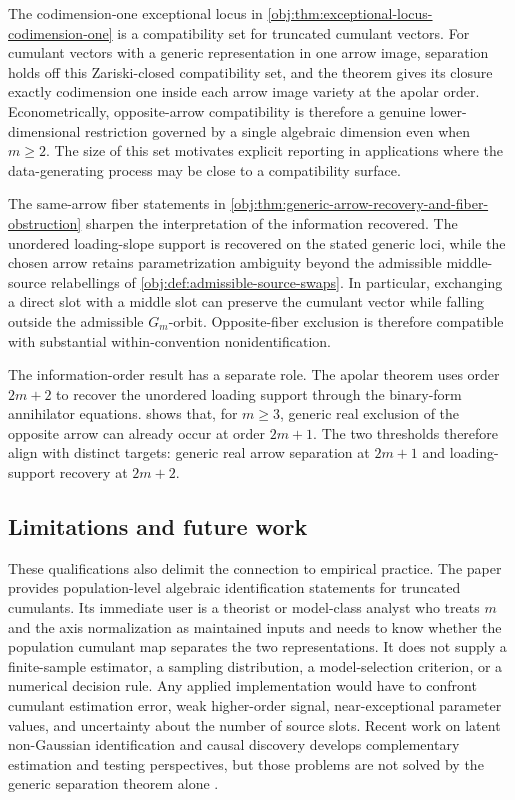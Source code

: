 \documentclass[11pt]{article}
\begin{document}
The codimension-one exceptional locus in \cref{obj:thm:exceptional-locus-codimension-one} is a compatibility set for truncated cumulant vectors. For cumulant vectors with a generic representation in one arrow image, separation holds off this Zariski-closed compatibility set, and the theorem gives its closure exactly codimension one inside each arrow image variety at the apolar order. Econometrically, opposite-arrow compatibility is therefore a genuine lower-dimensional restriction governed by a single algebraic dimension even when \(m\ge2\). The size of this set motivates explicit reporting in applications where the data-generating process may be close to a compatibility surface.

The same-arrow fiber statements in \cref{obj:thm:generic-arrow-recovery-and-fiber-obstruction} sharpen the interpretation of the information recovered. The unordered loading-slope support is recovered on the stated generic loci, while the chosen arrow retains parametrization ambiguity beyond the admissible middle-source relabellings of \cref{obj:def:admissible-source-swaps}. In particular, exchanging a direct slot with a middle slot can preserve the cumulant vector while falling outside the admissible \(G_m\)-orbit. Opposite-fiber exclusion is therefore compatible with substantial within-convention nonidentification.

The information-order result has a separate role. The apolar theorem uses order \(2m+2\) to recover the unordered loading support through the binary-form annihilator equations.  shows that, for \(m\ge3\), generic real exclusion of the opposite arrow can already occur at order \(2m+1\). The two thresholds therefore align with distinct targets: generic real arrow separation at \(2m+1\) and loading-support recovery at \(2m+2\).

\subsection{Limitations and future work}

These qualifications also delimit the connection to empirical practice. The paper provides population-level algebraic identification statements for truncated cumulants. Its immediate user is a theorist or model-class analyst who treats \(m\) and the axis normalization as maintained inputs and needs to know whether the population cumulant map separates the two representations. It does not supply a finite-sample estimator, a sampling distribution, a model-selection criterion, or a numerical decision rule. Any applied implementation would have to confront cumulant estimation error, weak higher-order signal, near-exceptional parameter values, and uncertainty about the number of source slots. Recent work on latent non-Gaussian identification and causal discovery develops complementary estimation and testing perspectives, but those problems are not solved by the generic separation theorem alone \citep{XieHuangChenEtAl2023,MorinishiShimizu2025,ChenGuPengEtAl2025}.
\end{document}
